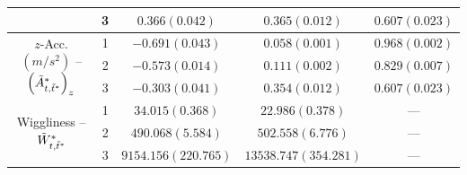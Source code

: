 \begin{table}[ht]
{\begin{tabular}{ccccc}
                                                                                       & 3                                    & $0.366 (0.042)$ & $0.365 (0.012)$ & $0.607 (0.023)$ \\ \hline
        \multirow{3}{*}{$z$-Acc. $(m/s^2)$ -- $\left(\tilde{A}^*_{t,\tilde t^*}\right)_z$}   & 1                                    & $-0.691 (0.043)$ & $0.058 (0.001)$ & $0.968 (0.002)$ \\
                                                                                       & 2                                    & $-0.573 (0.014)$ & $0.111 (0.002)$ & $0.829 (0.007)$ \\
                                                                                       & 3                                    & $-0.303 (0.041)$ & $0.354 (0.012)$ & $0.607 (0.023)$ \\ \hline
        \multirow{3}{*}{Wiggliness -- $\tilde{W}^*_{t,\tilde t^*}$}                           & 1                                    & $34.015 (0.368)$ & $22.986 (0.378)$ & ---           \\
                                                                                       & 2                                    & $490.068 (5.584)$ & $502.558 (6.776)$ & ---           \\
                                                                                       & 3                                    & $9154.156 (220.765)$ & $13538.747 (354.281)$ & ---           \\ \hline
    \end{tabular}
    }
    \label{table:emis_dists_CarHHMM-DFT}
\end{table}

